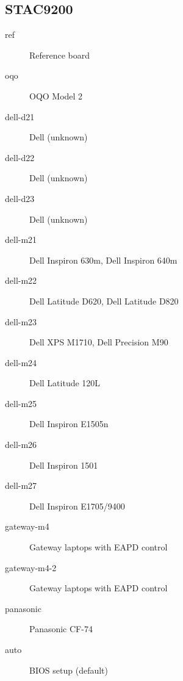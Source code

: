 \documentclass[a4paper,8pt,english]{sphinxmanual}
\begin{document}
\subsection{STAC9200}
\label{sound/hd-audio/models:stac9200}\begin{description}
\item[{ref}] \leavevmode
Reference board

\item[{oqo}] \leavevmode
OQO Model 2

\item[{dell-d21}] \leavevmode
Dell (unknown)

\item[{dell-d22}] \leavevmode
Dell (unknown)

\item[{dell-d23}] \leavevmode
Dell (unknown)

\item[{dell-m21}] \leavevmode
Dell Inspiron 630m, Dell Inspiron 640m

\item[{dell-m22}] \leavevmode
Dell Latitude D620, Dell Latitude D820

\item[{dell-m23}] \leavevmode
Dell XPS M1710, Dell Precision M90

\item[{dell-m24}] \leavevmode
Dell Latitude 120L

\item[{dell-m25}] \leavevmode
Dell Inspiron E1505n

\item[{dell-m26}] \leavevmode
Dell Inspiron 1501

\item[{dell-m27}] \leavevmode
Dell Inspiron E1705/9400

\item[{gateway-m4}] \leavevmode
Gateway laptops with EAPD control

\item[{gateway-m4-2}] \leavevmode
Gateway laptops with EAPD control

\item[{panasonic}] \leavevmode
Panasonic CF-74

\item[{auto}] \leavevmode
BIOS setup (default)

\end{description}
\end{document}

